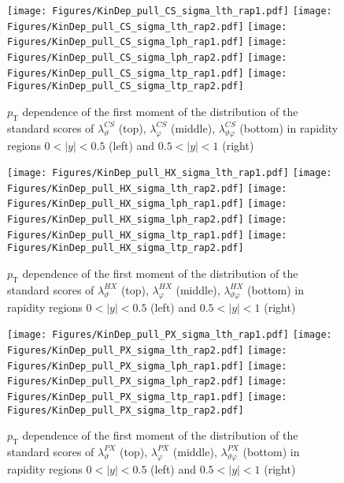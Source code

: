 \documentclass[12pt]{article}
\newcommand{\pT}{p_\mathrm{T}}
\newcommand{\absy}{\left |  y \right |}
\newcommand{\lamthCS}{\lambda^{\scriptscriptstyle CS}_\vartheta}
\newcommand{\lamphCS}{\lambda^{\scriptscriptstyle CS}_\varphi}
\newcommand{\lamthphCS}{\lambda^{\scriptscriptstyle CS}_{\vartheta \varphi}}
\newcommand{\lamthHX}{\lambda^{\scriptscriptstyle HX}_\vartheta}
\newcommand{\lamphHX}{\lambda^{\scriptscriptstyle HX}_\varphi}
\newcommand{\lamthphHX}{\lambda^{\scriptscriptstyle HX}_{\vartheta \varphi}}
\newcommand{\lamthPX}{\lambda^{\scriptscriptstyle PX}_\vartheta}
\newcommand{\lamphPX}{\lambda^{\scriptscriptstyle PX}_\varphi}
\newcommand{\lamthphPX}{\lambda^{\scriptscriptstyle PX}_{\vartheta \varphi}}
\begin{document}
\begin{figure}[htbp]
\centering
\texttt{[image: Figures/KinDep\_pull\_CS\_sigma\_lth\_rap1.pdf]}
\texttt{[image: Figures/KinDep\_pull\_CS\_sigma\_lth\_rap2.pdf]}
\texttt{[image: Figures/KinDep\_pull\_CS\_sigma\_lph\_rap1.pdf]}
\texttt{[image: Figures/KinDep\_pull\_CS\_sigma\_lph\_rap2.pdf]}
\texttt{[image: Figures/KinDep\_pull\_CS\_sigma\_ltp\_rap1.pdf]}
\texttt{[image: Figures/KinDep\_pull\_CS\_sigma\_ltp\_rap2.pdf]}
\caption{$\pT$ dependence of the first moment of the distribution of the
standard scores of $\lamthCS$ (top), $\lamphCS$ (middle), $\lamthphCS$ (bottom)
in rapidity regions $0<\absy<0.5$ (left) and $0.5<\absy<1$ (right)}
\end{figure}
\clearpage

\begin{figure}[htbp]
\centering
\texttt{[image: Figures/KinDep\_pull\_HX\_sigma\_lth\_rap1.pdf]}
\texttt{[image: Figures/KinDep\_pull\_HX\_sigma\_lth\_rap2.pdf]}
\texttt{[image: Figures/KinDep\_pull\_HX\_sigma\_lph\_rap1.pdf]}
\texttt{[image: Figures/KinDep\_pull\_HX\_sigma\_lph\_rap2.pdf]}
\texttt{[image: Figures/KinDep\_pull\_HX\_sigma\_ltp\_rap1.pdf]}
\texttt{[image: Figures/KinDep\_pull\_HX\_sigma\_ltp\_rap2.pdf]}
\caption{$\pT$ dependence of the first moment of the distribution of the
standard scores of $\lamthHX$ (top), $\lamphHX$ (middle), $\lamthphHX$ (bottom)
in rapidity regions $0<\absy<0.5$ (left) and $0.5<\absy<1$ (right)}
\end{figure}
\clearpage

\begin{figure}[htbp]
\centering
\texttt{[image: Figures/KinDep\_pull\_PX\_sigma\_lth\_rap1.pdf]}
\texttt{[image: Figures/KinDep\_pull\_PX\_sigma\_lth\_rap2.pdf]}
\texttt{[image: Figures/KinDep\_pull\_PX\_sigma\_lph\_rap1.pdf]}
\texttt{[image: Figures/KinDep\_pull\_PX\_sigma\_lph\_rap2.pdf]}
\texttt{[image: Figures/KinDep\_pull\_PX\_sigma\_ltp\_rap1.pdf]}
\texttt{[image: Figures/KinDep\_pull\_PX\_sigma\_ltp\_rap2.pdf]}
\caption{$\pT$ dependence of the first moment of the distribution of the
standard scores of $\lamthPX$ (top), $\lamphPX$ (middle), $\lamthphPX$ (bottom)
in rapidity regions $0<\absy<0.5$ (left) and $0.5<\absy<1$ (right)}
\end{figure}
\clearpage
\end{document}
